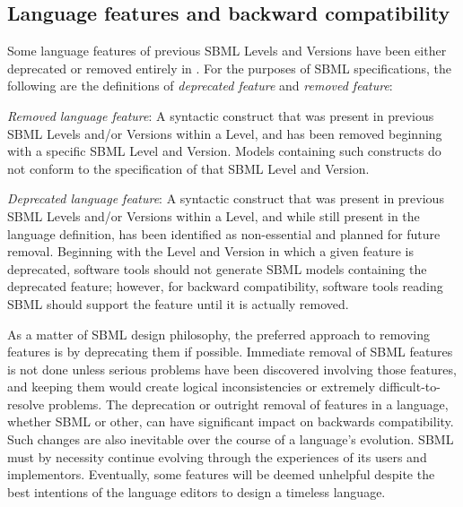 \subsection{Language features and backward compatibility}
\label{sec:deprecated-features}

Some language features of previous SBML Levels and Versions have
been either deprecated or removed entirely in \sbmltwotwo.  For
the purposes of SBML specifications, the following are the
definitions of \emph{deprecated feature} and \emph{removed
  feature}:
\begin{description}
  
\item \emph{Removed language feature}: A syntactic construct that
  was present in previous SBML Levels and/or Versions within a
  Level, and has been removed beginning with a specific SBML Level
  and Version.  Models containing such constructs do not conform
  to the specification of that SBML Level and Version.
  
\item \emph{Deprecated language feature}: A syntactic construct
  that was present in previous SBML Levels and/or Versions within
  a Level, and while still present in the language definition, has
  been identified as non-essential and planned for future removal.
  Beginning with the Level and Version in which a given feature is
  deprecated, software tools should not generate SBML models
  containing the deprecated feature; however, for backward
  compatibility, software tools reading SBML should support the
  feature until it is actually removed.

\end{description}

As a matter of SBML design philosophy, the preferred approach to
removing features is by deprecating them if possible.  Immediate
removal of SBML features is not done unless serious problems have
been discovered involving those features, and keeping them would
create logical inconsistencies or extremely difficult-to-resolve
problems.  The deprecation or outright removal of features in a
language, whether SBML or other, can have significant impact on
backwards compatibility.  Such changes are also inevitable over
the course of a language's evolution.  SBML must by necessity
continue evolving through the experiences of its users and
implementors.  Eventually, some features will be deemed unhelpful
despite the best intentions of the language editors to design a
timeless language.

